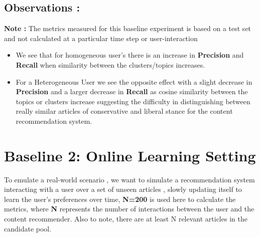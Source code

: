\documentclass[a4paper,fontsize=9.0pt]{scrartcl}
\begin{document}
\subsection{Observations :}
\begin{flushleft}
\textbf{Note :} The metrics measured for this baseline experiment is based on a test set and not calculated at a particular time step or user-interaction
\begin{itemize}
    \item We see that for homogeneous user's there is an increase in \textbf{Precision} and \textbf{Recall} when similarity between the clusters/topics increases.
    \item For a Heterogeneous User we see the opposite effect with a slight decrease in \textbf{Precision} and a larger decrease in \textbf{Recall} as cosine similarity between the topics or clusters increase suggesting the difficulty in distinguishing between really similar articles of conservative and liberal stance for the content recommendation system.
\end{itemize}
\end{flushleft}



\vspace{-1ex}
\section{Baseline 2: Online Learning Setting}
\begin{flushleft}
To emulate a real-world scenario , we want to simulate a recommendation system interacting with a user over a set of unseen articles , slowly updating itself to learn the user's preferences over time, \textbf{N=200} is used here to calculate the metrics, where \textbf{N }represents the number of interactions between the user and the content recommender. Also to note, there are at least N relevant articles in the candidate pool. 
\end{flushleft}
\end{document}
